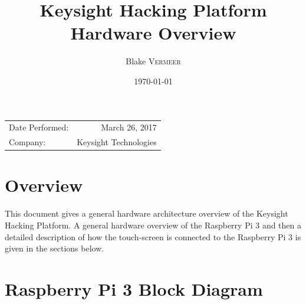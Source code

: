 \documentclass{article}
\title{Keysight Hacking Platform Hardware Overview} %
\author{Blake \textsc{Vermeer}} %
\date{\today} %
\begin{document}
\maketitle %

\begin{center}
\begin{tabular}{l r}
Date Performed: & March 26, 2017 \\ %
Company: & Keysight Technologies %
\end{tabular}
\end{center}


\section{Overview}

This document gives a general hardware architecture overview of the Keysight Hacking Platform. A general hardware overview of the Raspberry Pi 3 and then a detailed description of how the touch-screen is connected to the Raspberry Pi 3 is given in the sections below.


\section{Raspberry Pi 3 Block Diagram}
\end{document}
